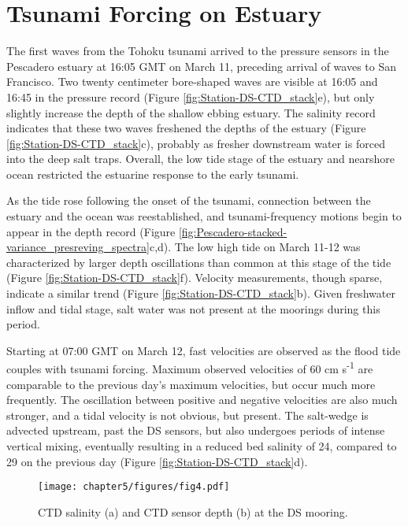 \section{Tsunami Forcing on Estuary}

The first waves from the Tohoku tsunami arrived to the pressure sensors
in the Pescadero estuary at 16:05 GMT on March 11, preceding arrival
of waves to San Francisco. Two twenty centimeter bore-shaped waves
are visible at 16:05 and 16:45 in the pressure record (Figure \ref{fig:Station-DS-CTD_stack}e),
but only slightly increase the depth of the shallow ebbing estuary.
The salinity record indicates that these two waves freshened the depths
of the estuary (Figure \ref{fig:Station-DS-CTD_stack}c), probably
as fresher downstream water is forced into the deep salt traps. Overall,
the low tide stage of the estuary and nearshore ocean restricted the
estuarine response to the early tsunami. 

As the tide rose following the onset of the tsunami, connection between
the estuary and the ocean was reestablished, and tsunami-frequency
motions begin to appear in the depth record (Figure \ref{fig:Pescadero-stacked-variance_presreving_spectra}c,d).
The low high tide on March 11-12 was characterized by larger depth
oscillations than common at this stage of the tide (Figure \ref{fig:Station-DS-CTD_stack}f).
Velocity measurements, though sparse, indicate a similar trend (Figure
\ref{fig:Station-DS-CTD_stack}b). Given freshwater inflow and tidal
stage, salt water was not present at the moorings during this period. 

Starting at 07:00 GMT on March 12, fast velocities are observed as
the flood tide couples with tsunami forcing. Maximum observed velocities
of 60 cm s\textsuperscript{-1} are comparable to the previous day's
maximum velocities, but occur much more frequently. The oscillation
between positive and negative velocities are also much stronger, and
a tidal velocity is not obvious, but present. The salt-wedge is advected
upstream, past the DS sensors, but also undergoes periods of intense
vertical mixing, eventually resulting in a reduced bed salinity of
24, compared to 29 on the previous day (Figure \ref{fig:Station-DS-CTD_stack}d). 



\begin{figure}
\texttt{[image: chapter5/figures/fig4.pdf]}

\protect\caption{CTD salinity (a) and CTD sensor depth (b) at the DS mooring. \label{fig:ctd_longer_record}}
\end{figure}

